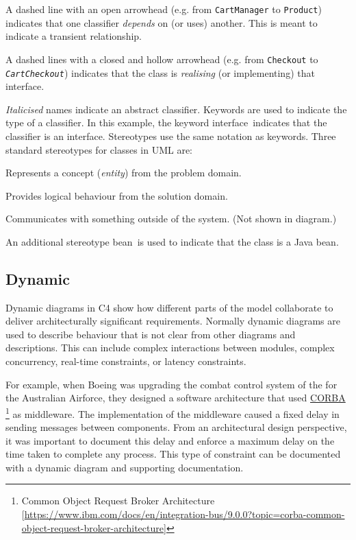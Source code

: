 A dashed line with an open arrowhead (e.g. from \texttt{CartManager} to \texttt{Product})
indicates that one classifier \emph{depends} on (or uses) another. This is meant to indicate a transient relationship.

A dashed lines with a closed and hollow arrowhead (e.g. from \texttt{Checkout} to \texttt{\textsl{CartCheckout}})
indicates that the class is \emph{realising} (or implementing) that interface.

\textit{Italicised} names indicate an abstract classifier. Keywords are used to indicate the type of a classifier.
In this example, the keyword \guillemotleft interface\guillemotright~indicates that the classifier is an interface.
Stereotypes use the same notation as keywords. Three standard stereotypes for classes in UML are:
\begin{description}[nosep,left=5mm]
    \item[\guillemotleft entity\guillemotright] Represents a concept (\emph{entity}) from the problem domain.
    \item[\guillemotleft control\guillemotright] Provides logical behaviour from the solution domain.
    \item[\guillemotleft boundary\guillemotright] Communicates with something outside of the system. (Not shown in diagram.)
\end{description}
An additional stereotype \guillemotleft bean\guillemotright~is used to indicate that the class is a Java bean.

\subsection{Dynamic}
Dynamic diagrams in C4 show how different parts of the model collaborate to deliver architecturally significant requirements.
Normally dynamic diagrams are used to describe behaviour that is not clear from other diagrams and descriptions.
This can include complex interactions between modules, complex concurrency, real-time constraints, or latency constraints.

For example, when Boeing was upgrading the combat control system of the
for the Australian Airforce, they designed a software architecture that used
\href{https://www.ibm.com/docs/en/integration-bus/9.0.0?topic=corba-common-object-request-broker-architecture}{CORBA}%
\footnote{Common Object Request Broker Architecture [\url{https://www.ibm.com/docs/en/integration-bus/9.0.0?topic=corba-common-object-request-broker-architecture}]}
as middleware.
The implementation of the middleware caused a fixed delay in sending messages between components.
From an architectural design perspective,
it was important to document this delay and enforce a maximum delay on the time taken to complete any process.
This type of constraint can be documented with a dynamic diagram and supporting documentation.

